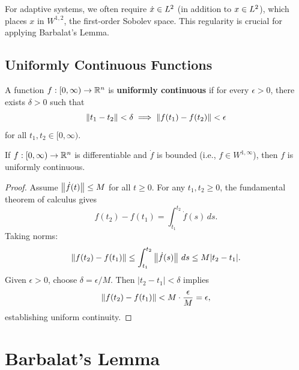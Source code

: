 \begin{remark}
For adaptive systems, we often require $\dot{x} \in L^{2}$ (in addition to $x \in L^{2}$), which places $x$ in $W^{1,2}$, the first-order Sobolev space. This regularity is crucial for applying Barbalat's Lemma.
\end{remark}

\subsection{Uniformly Continuous Functions}

\begin{definition}
A function $f: [0,\infty) \to \mathbb{R}^n$ is \textbf{uniformly continuous} if for every $\epsilon > 0$, there exists $\delta > 0$ such that
\begin{equation}
    \left\| t_1 - t_2 \right\| < \delta \implies \left\| f(t_1) - f(t_2) \right\| < \epsilon
\end{equation}
for all $t_1, t_2 \in [0, \infty)$.
\end{definition}

\begin{lemma}
\label{lem:unif_cont}
If $f: [0,\infty) \to \mathbb{R}^n$ is differentiable and $\dot{f}$ is bounded (i.e., $f \in W^{1,\infty}$), then $f$ is uniformly continuous.
\end{lemma}

\begin{proof}
Assume $\left\| \dot{f}(t) \right\| \leq M$ for all $t \geq 0$. For any $t_1, t_2 \geq 0$, the fundamental theorem of calculus gives
\begin{equation}
    f(t_2) - f(t_1) = \int_{t_1}^{t_2} \dot{f}(s) \, ds.
\end{equation}
Taking norms:
\begin{equation}
    \left\| f(t_2) - f(t_1) \right\| \leq \int_{t_1}^{t_2} \left\| \dot{f}(s) \right\| \, ds \leq M |t_2 - t_1|.
\end{equation}
Given $\epsilon > 0$, choose $\delta = \epsilon / M$. Then $|t_2 - t_1| < \delta$ implies
\begin{equation}
    \left\| f(t_2) - f(t_1) \right\| < M \cdot \frac{\epsilon}{M} = \epsilon,
\end{equation}
establishing uniform continuity.
\end{proof}

\section{Barbalat's Lemma}

